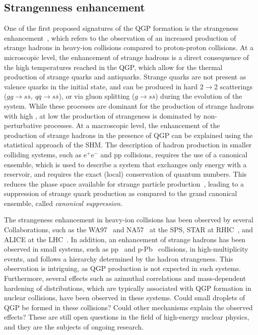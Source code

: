 \subsection{Strangenness enhancement}\label{subsec:StrangenessEnhancement}
One of the first proposed signatures of the QGP formation is the strangeness enhancement~\cite{Rafelski:1982pu}, which refers to the observation of an increased production of strange hadrons in heavy-ion collisions compared to proton-proton collisions. At a microscopic level, the enhancement of strange hadrons is a direct consequence of the high temperatures reached in the QGP, which allow for the thermal production of strange quarks and antiquarks. Strange quarks are not present as valence quarks in the initial state, and can be produced in hard $2\rightarrow 2$ scatterings ($gg\rightarrow s\overline{s},~q\overline{q}\rightarrow s\overline{s}$), or via gluon splitting ($g\rightarrow s\overline{s}$) during the evolution of the system. While these processes are dominant for the production of strange hadrons with high \pt, at low \pt the production of strangeness is dominated by non-perturbative processes. At a macroscopic level, the enhancement of the production of strange hadrons in the presence of QGP can be explained using the statistical approach of the SHM. The description of hadron production in smaller colliding systems, such as $\mathrm{e^+e^-}$ and pp collisions, requires the use of a canonical ensemble, which is used to describe a system that exchanges only energy with a reservoir, and requires the exact (local) conservation of quantum numbers. This reduces the phase space available for strange particle production~\cite{Redlich:2001kb}, leading to a suppression of strange quark production as compared to the grand canonical ensemble, called \emph{canonical suppression}. 

The strangeness enhancement in heavy-ion collisions has been observed by several Collaborations, such as the WA97~\cite{WA97:1999uwz} and NA57~\cite{NA57:2010tnk} at the SPS, STAR at RHIC~\cite{STAR:2007cqw}, and ALICE at the LHC~\cite{ALICE:2013xmt}. In addition, an enhancement of strange hadrons has been observed in small systems, such as pp~\cite{ALICE:2016fzo} and p-Pb~\cite{ALICE:2013wgn, ALICE:2015mpp} collisions, in high-multiplicity events, and follows a hierarchy determined by the hadron strangeness. This observation is intriguing, as QGP production is not expected in such systems. Furthermore, several effects such as azimuthal correlations and mass-dependent hardening of \pt distributions, which are typically associated with QGP formation in nuclear collisions, have been observed in these systems. Could small droplets of QGP be formed in these collisions? Could other mechanisms explain the observed effects? These are still open questions in the field of high-energy nuclear physics, and they are the subjects of ongoing research.

